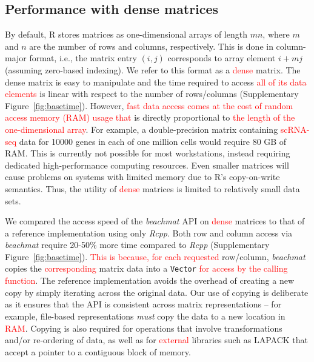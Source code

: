 \documentclass{article}
\newcommand{\beachmat}{\textit{beachmat}}
\newcommand{\code}[1]{\texttt{#1}}
\newcommand{\revised}[1]{\textcolor{red}{#1}}
\begin{document}
\subsection{Performance with dense matrices}
By default, R stores matrices as one-dimensional arrays of length $mn$, where $m$ and $n$ are the number of rows and columns, respectively.
This is done in column-major format, i.e., the matrix entry $(i, j)$ corresponds to array element $i + mj$ (assuming zero-based indexing).
We refer to this format as a \revised{dense} matrix.
The dense matrix is easy to manipulate and the time required to access \revised{all of its data elements} is linear with respect to the number of rows/columns (Supplementary Figure~\ref{fig:basetime}).
However, \revised{fast data access comes at the cost of random access memory (RAM) usage that} is directly proportional to \revised{the length of the one-dimensional array}.
For example, a double-precision matrix containing \revised{scRNA-seq} data for 10000 genes in each of one million cells would require 80 GB of RAM.
This is currently not possible for most workstations, instead requiring dedicated high-performance computing resources.
Even smaller matrices will cause problems on systems with limited memory due to R's copy-on-write semantics.
Thus, the utility of \revised{dense} matrices is limited to relatively small data sets.


We compared the access speed of the \beachmat{} API on \revised{dense} matrices to that of a reference implementation using only \textit{Rcpp}.
Both row and column access via \beachmat{} require 20-50\% more time compared to \textit{Rcpp} (Supplementary Figure~\ref{fig:basetime}).
\revised{This is because, for each requested} row/column, \beachmat{} copies the \revised{corresponding} matrix data into a \code{Vector} \revised{for access by the calling function}.
The reference implementation avoids the overhead of creating a new copy by simply iterating across the original data.
Our use of copying is deliberate as it ensures that the API is consistent across matrix representations -- for example, file-based representations \textit{must} copy the data to a new location in \revised{RAM}.
Copying is also required for operations that involve transformations and/or re-ordering of data, as well as for \revised{external} libraries such as LAPACK that accept a pointer to a contiguous block of memory.
\end{document}
